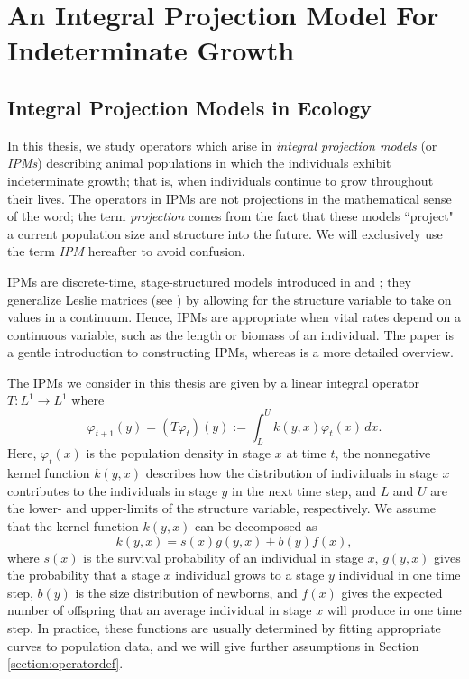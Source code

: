 \chapter{An Integral Projection Model For Indeterminate Growth}

\section{Integral Projection Models in Ecology} \label{section:ipmsinecology}

In this thesis, we study operators which arise in \emph{integral projection models} (or \emph{IPMs}) describing animal populations in which the individuals exhibit indeterminate growth; that is, when individuals continue to grow throughout their lives. The operators in IPMs are not projections in the mathematical sense of the word; the term \emph{projection} comes from the fact that these models ``project" a current population size and structure into the future. We will exclusively use the term \emph{IPM} hereafter to avoid confusion.

IPMs are discrete-time, stage-structured models introduced in \cite{Easterling1998} and \cite{Ellner2006}; they generalize Leslie matrices (see \cite{Caswell2001}) by allowing for the structure variable to take on values in a continuum. Hence, IPMs are appropriate when vital rates depend on a continuous variable, such as the length or biomass of an individual. The paper \cite{Briggs2010} is a gentle introduction to constructing IPMs, whereas \cite{Ellner2016} is a more detailed overview.

The IPMs we consider in this thesis are given by a linear integral operator $T:L^1 \to L^1$ where
\[\varphi_{t+1}(y) = (T\varphi_t)(y) := \int_L^U k(y,x) \varphi_t(x) \, dx.\]
Here, $\varphi_{t}(x)$ is the population density in stage $x$ at time $t$, the nonnegative kernel function $k(y,x)$ describes how the distribution of individuals in stage $x$ contributes to the individuals in stage $y$ in the next time step, and $L$ and $U$ are the lower- and upper-limits of the structure variable, respectively. We assume that the kernel function $k(y,x)$ can be decomposed as 
\[k(y, x) = s(x) g(y,x) + b(y)f(x),\]
where $s(x)$ is the survival probability of an individual in stage $x$, $g(y,x)$ gives the probability that a stage $x$ individual grows to a stage $y$ individual in one time step, $b(y)$ is the size distribution of newborns, and $f(x)$ gives the expected number of offspring that an average individual in stage $x$ will produce in one time step. In practice, these functions are usually determined by fitting appropriate curves to population data, and we will give further assumptions in Section \ref{section:operatordef}.

